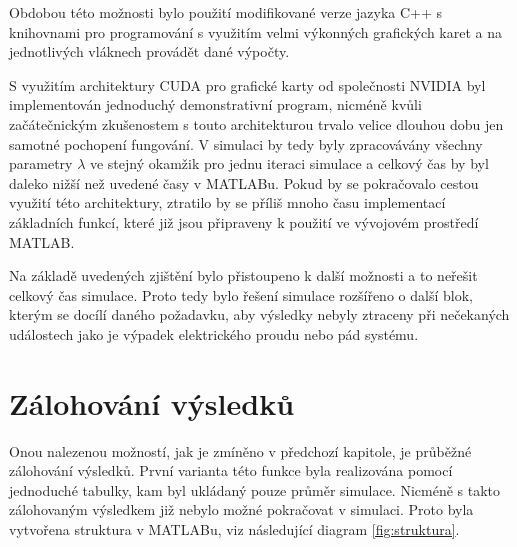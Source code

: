 \documentclass[FM,BP]{tulthesis}
\begin{document}
Obdobou této možnosti bylo použití modifikované verze jazyka C++ s knihovnami pro programování s využitím velmi výkonných grafických karet a na jednotlivých vláknech provádět dané výpočty. 

S využitím architektury CUDA pro grafické karty od společnosti NVIDIA byl implementován jednoduchý demonstrativní program, nicméně kvůli začátečnickým zkušenostem s touto architekturou trvalo velice dlouhou dobu jen samotné pochopení fungování. V simulaci by tedy byly zpracovávány všechny parametry $\lambda$ ve stejný okamžik pro jednu iteraci simulace a celkový čas by byl daleko nižší než uvedené časy v MATLABu. Pokud by se pokračovalo cestou využití této architektury, ztratilo by se příliš mnoho času implementací základních funkcí, které již jsou připraveny k použití ve vývojovém prostředí MATLAB.  

Na základě uvedených zjištění bylo přistoupeno k další možnosti a to neřešit celkový čas simulace. Proto tedy bylo řešení simulace rozšířeno o další blok, kterým se docílí daného požadavku, aby výsledky nebyly ztraceny při nečekaných událostech jako je výpadek elektrického proudu nebo pád systému.

\section{Zálohování výsledků}
\label{subch:backup}
Onou nalezenou možností, jak je zmíněno v předchozí kapitole, je průběžné zálohování výsledků. První varianta této funkce byla realizována pomocí jednoduché tabulky, kam byl ukládaný pouze průměr simulace. Nicméně s takto zálohovaným výsledkem již nebylo možné pokračovat v simulaci. Proto byla vytvořena struktura v MATLABu, viz následující diagram \ref{fig:struktura}.
\end{document}
